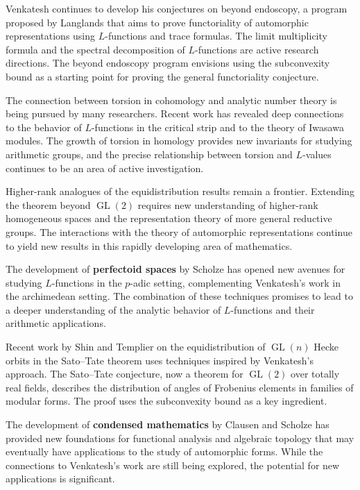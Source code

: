 Venkatesh continues to develop his conjectures on beyond endoscopy, a program proposed by Langlands that aims to prove functoriality of automorphic representations using $L$-functions and trace formulas. The limit multiplicity formula and the spectral decomposition of $L$-functions are active research directions. The beyond endoscopy program envisions using the subconvexity bound as a starting point for proving the general functoriality conjecture.

The connection between torsion in cohomology and analytic number theory is being pursued by many researchers. Recent work has revealed deep connections to the behavior of $L$-functions in the critical strip and to the theory of Iwasawa modules. The growth of torsion in homology provides new invariants for studying arithmetic groups, and the precise relationship between torsion and $L$-values continues to be an area of active investigation.

Higher-rank analogues of the equidistribution results remain a frontier. Extending the theorem beyond $\operatorname{GL}(2)$ requires new understanding of higher-rank homogeneous spaces and the representation theory of more general reductive groups. The interactions with the theory of automorphic representations continue to yield new results in this rapidly developing area of mathematics.

The development of \textbf{perfectoid spaces} by Scholze has opened new avenues for studying $L$-functions in the $p$-adic setting, complementing Venkatesh's work \cite{venkatesh2018} in the archimedean setting. The combination of these techniques promises to lead to a deeper understanding of the analytic behavior of $L$-functions and their arithmetic applications.

Recent work by Shin and Templier on the equidistribution of $\operatorname{GL}(n)$ Hecke orbits in the Sato--Tate theorem uses techniques inspired by Venkatesh's approach. The Sato--Tate conjecture, now a theorem for $\operatorname{GL}(2)$ over totally real fields, describes the distribution of angles of Frobenius elements in families of modular forms. The proof uses the subconvexity bound as a key ingredient.

The development of \textbf{condensed mathematics} by Clausen and Scholze has provided new foundations for functional analysis and algebraic topology that may eventually have applications to the study of automorphic forms. While the connections to Venkatesh's work \cite{venkatesh2018} are still being explored, the potential for new applications is significant.


